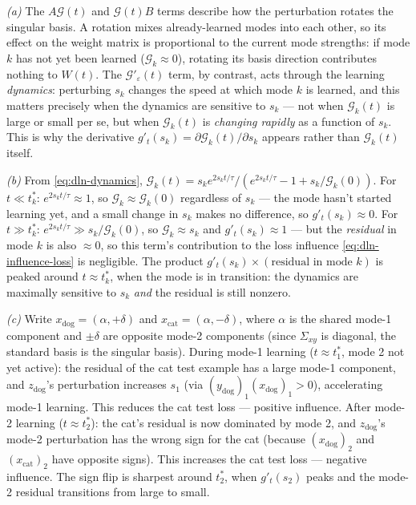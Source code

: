 \begin{solution}

\textit{(a)} The $A\mathcal{G}(t)$ and $\mathcal{G}(t)B$ terms describe how the perturbation rotates the singular basis. A rotation mixes already-learned modes into each other, so its effect on the weight matrix is proportional to the current mode strengths: if mode $k$ has not yet been learned ($\mathcal{G}_k \approx 0$), rotating its basis direction contributes nothing to $W(t)$. The $\mathcal{G}'_\varepsilon(t)$ term, by contrast, acts through the learning \emph{dynamics}: perturbing $s_k$ changes the speed at which mode $k$ is learned, and this matters precisely when the dynamics are sensitive to $s_k$ --- not when $\mathcal{G}_k(t)$ is large or small per se, but when $\mathcal{G}_k(t)$ is \emph{changing rapidly} as a function of $s_k$. This is why the derivative $g'_t(s_k) = \partial\mathcal{G}_k(t)/\partial s_k$ appears rather than $\mathcal{G}_k(t)$ itself.

\textit{(b)} From \eqref{eq:dln-dynamics}, $\mathcal{G}_k(t) = s_k e^{2s_k t/\tau}/(e^{2s_k t/\tau} - 1 + s_k/\mathcal{G}_k(0))$. For $t \ll t_k^*$: $e^{2s_k t/\tau} \approx 1$, so $\mathcal{G}_k \approx \mathcal{G}_k(0)$ regardless of $s_k$ --- the mode hasn't started learning yet, and a small change in $s_k$ makes no difference, so $g'_t(s_k) \approx 0$. For $t \gg t_k^*$: $e^{2s_k t/\tau} \gg s_k/\mathcal{G}_k(0)$, so $\mathcal{G}_k \approx s_k$ and $g'_t(s_k) \approx 1$ --- but the \emph{residual} in mode $k$ is also $\approx 0$, so this term's contribution to the loss influence \eqref{eq:dln-influence-loss} is negligible. The product $g'_t(s_k) \times (\text{residual in mode } k)$ is peaked around $t \approx t_k^*$, when the mode is in transition: the dynamics are maximally sensitive to $s_k$ \emph{and} the residual is still nonzero.

\textit{(c)} Write $x_{\mathrm{dog}} = (\alpha, +\delta)$ and $x_{\mathrm{cat}} = (\alpha, -\delta)$, where $\alpha$ is the shared mode-1 component and $\pm\delta$ are opposite mode-2 components (since $\Sigma_{xy}$ is diagonal, the standard basis is the singular basis). During mode-1 learning ($t \approx t_1^*$, mode 2 not yet active): the residual of the cat test example has a large mode-1 component, and $z_{\mathrm{dog}}$'s perturbation increases $s_1$ (via $(y_{\mathrm{dog}})_1 (x_{\mathrm{dog}})_1 > 0$), accelerating mode-1 learning. This reduces the cat test loss --- positive influence. After mode-2 learning ($t \approx t_2^*$): the cat's residual is now dominated by mode 2, and $z_{\mathrm{dog}}$'s mode-2 perturbation has the wrong sign for the cat (because $(x_{\mathrm{dog}})_2$ and $(x_{\mathrm{cat}})_2$ have opposite signs). This increases the cat test loss --- negative influence. The sign flip is sharpest around $t_2^*$, when $g'_t(s_2)$ peaks and the mode-2 residual transitions from large to small.
\end{solution}
